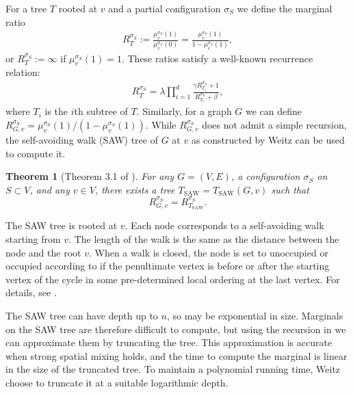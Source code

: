 \documentclass[10pt,a4paper]{article}
\newtheorem{theorem}{Theorem}[section]
\newcommand{\defeq}{:=}
\newcommand{\TSAW}{T_{\mathrm{SAW}}}
\begin{document}
For a tree $T$ rooted at $v$ and a partial configuration $\sigma_S$ we define the marginal ratio
\begin{align*}
  R_T^{\sigma_S}\defeq\frac{\mu_v^{\sigma_S}(1)}{\mu_v^{\sigma_S}(0)}=\frac{\mu_v^{\sigma_S}(1)}{1-\mu_v^{\sigma_S}(1)},
\end{align*}
or $R_T^{\sigma_S}\defeq\infty$ if $\mu_v^{\sigma_S}(1)=1$.
These ratios satisfy a well-known recurrence relation:
\begin{align}
\label{saw-recursion}
R_T^{\sigma_S}=\lambda\prod_{i=1}^d\frac{\gamma R_{T_i}^{\sigma_S}+1}{R_{T_i}^{\sigma_S}+\beta},
\end{align}
where $T_i$ is the $i$th subtree of $T$. Similarly, for a graph $G$ we can define $R_{G,v}^{\sigma_S}=\mu_v^{\sigma_S}(1)/(1-\mu_v^{\sigma_S}(1))$.
While $R_{G,v}^{\sigma_S}$ does not admit a simple recursion, the self-avoiding walk (SAW) tree of $G$ at $v$ as constructed by Weitz \cite{Wei06} can be used to compute it. 

\begin{theorem}[Theorem 3.1 of \cite{Wei06}]
\label{saw-theorem}
For any $G=(V,E)$, a configuration $\sigma_S$ on $S\subset V$, and any $v\in V$, there exists a tree $\TSAW=\TSAW(G,v)$ such that
\[R_{G,v}^{\sigma_S}=R_{\TSAW}^{\sigma_S}.\]
\end{theorem}

The SAW tree is rooted at $v$.
Each node corresponds to a self-avoiding walk starting from $v$. The length of the walk is the same as the distance between the node and the root $v$.
When a walk is closed, the node is set to unoccupied or occupied according to if the penultimate vertex is before or after the starting vertex of the cycle in some pre-determined local ordering at the last vertex.
For details, see \cite{Wei06}.

The SAW tree can have depth up to $n$, so may be exponential in size. Marginals on the SAW tree are therefore difficult to compute, but using the recursion in  we can approximate them by truncating the tree. 
This approximation is accurate when strong spatial mixing holds,
and the time to compute the marginal is linear in the size of the truncated tree.
To maintain a polynomial running time, Weitz~\cite{Wei06} choose to truncate it at a suitable logarithmic depth.

\end{document}
